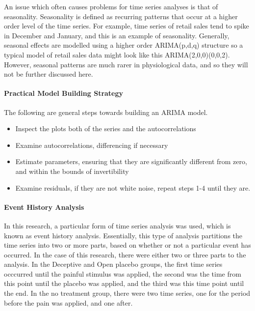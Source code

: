 An issue which often causes problems for time series analyses is that of seasonality. Seasonality is defined as recurring patterns that occur at a higher order level of the time series. For example, time series of retail sales tend to spike in December and January, and this is an example of seasonality. Generally, seasonal effects are modelled using a higher order ARIMA(p,d,q) structure so a typical model of retail sales data might look like this ARIMA(2,0,0)(0,0,2). However, seasonal patterns are much rarer in physiological data, and so they will not be further discussed here. 

\paragraph{Practical Model Building Strategy}

The following are general steps towards building an ARIMA model. 

\begin{itemize}
\item Inspect the plots both of the series and the autocorrelations
\item Examine autocorrelations, differencing if necessary
\item Estimate parameters, ensuring that they are significantly different from zero, and within the bounds of invertibility
\item Examine residuals, if they are not white noise, repeat steps 1-4 until they are. 
\end{itemize}


\paragraph{Event History Analysis}

In this research, a particular form of time series analysis was used, which is known as event history analysis\cite{mccleary1980applied}. Essentially, this type of analysis partitions the time series into two or more parts, based on whether or not a particular event has occurred. In the case of this research, there were either two or three parts to the analysis. In the Deceptive and Open placebo groups, the first time series occcurred until the painful stimulus was applied, the second was the time from this point until the placebo was applied, and the third was this time point until the end. In the no treatment group, there were two time series, one for the period before the pain was applied, and one after.

